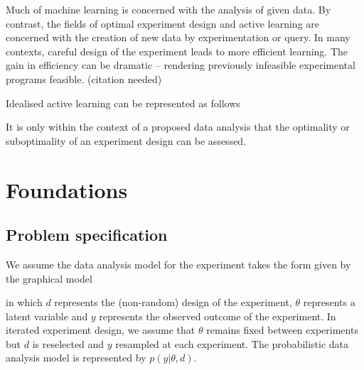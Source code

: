 Much of machine learning is concerned with the analysis of given data. By contrast, the fields of optimal experiment design and active learning are concerned with the creation of new data by experimentation or query. In many contexts, careful design of the experiment leads to more efficient learning. The gain in efficiency can be dramatic -- rendering previously infeasible experimental programs feasible. (citation needed)

Idealised active learning can be represented as follows
\begin{center}
\end{center}
It is only within the context of a proposed data analysis that the optimality or suboptimality of an experiment design can be assessed.

\section{Foundations}
\subsection{Problem specification}
We assume the data analysis model for the experiment takes the form given by the graphical model
\begin{center}
\end{center}
in which $d$ represents the (non-random) design of the experiment, $\theta$ represents a latent variable and $y$ represents the observed outcome of the experiment. In iterated experiment design, we assume that $\theta$ remains fixed between experiments but $d$ is reselected and $y$ resampled at each experiment. The probabilistic data analysis model is represented by $p(y | \theta, d)$.


